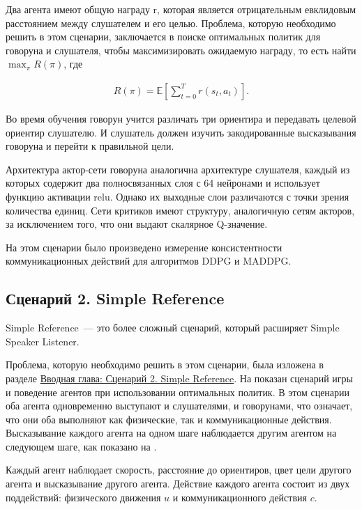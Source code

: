 Два агента имеют общую награду r, которая является отрицательным евклидовым расстоянием между слушателем и его целью. Проблема, которую необходимо решить в этом сценарии, заключается в поиске оптимальных политик для говоруна и слушателя, чтобы максимизировать ожидаемую награду, то есть найти $\max_{\pi}R(\pi)$, где

\begin{equation}
    \begin{multlined}
        R(\pi) = \mathbb{E}[\sum_{t=0}^{T}r(s_t, a_t)].
    \end{multlined}
\end{equation}

Во время обучения говорун учится различать три ориентира и передавать целевой ориентир слушателю. И слушатель должен изучить закодированные высказывания говоруна и перейти к правильной цели.

Архитектура актор-сети говоруна аналогична архитектуре слушателя, каждый из которых содержит два полносвязанных слоя с 64 нейронами и использует функцию активации relu. Однако их выходные слои различаются с точки зрения количества единиц. Сети критиков имеют структуру, аналогичную сетям акторов, за исключением того, что они выдают скалярное Q-значение.

На этом сценарии было произведено измерение консистентности коммуникационных действий для алгоритмов DDPG и MADDPG.

\subsection{Сценарий 2. Simple Reference} \label{exp-sr}

Simple Reference~--- это более сложный сценарий, который расширяет Simple Speaker Listener.

Проблема, которую необходимо решить в этом сценарии, была изложена в разделе \hyperref[intro-sr]{Вводная глава: Сценарий 2. Simple Reference}. На  показан сценарий игры и поведение агентов при использовании оптимальных политик. В этом сценарии оба агента одновременно выступают и слушателями, и говорунами, что означает, что они оба выполняют как физические, так и коммуникационные действия. Высказывание каждого агента на одном шаге наблюдается другим агентом на следующем шаге, как показано на .

Каждый агент наблюдает скорость, расстояние до ориентиров, цвет цели другого агента и высказывание другого агента. Действие каждого агента состоит из двух поддействий: физического движения $u$ и коммуникационного действия $c$.

